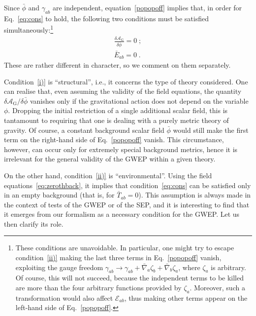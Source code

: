 \documentclass[a4paper,showkeys,aps,prd,reprint,nofootinbib,showpacs,twocolumn]{revtex4-1}
\newcommand{\subeq}[1]{\begin{subequations} #1 \end{subequations}}
\newcommand{\eq}[1]{\( #1 \)}
\newcommand{\gat}[1]{\begin{gather} #1 \end{gather}}
\newcommand{\Cal}[1]{\mathcal{#1}}
\theoremstyle{plain}
\begin{document}
Since \eq{\bar{\phi}} and \eq{\gamma_{ab}} are independent, equation~\eqref{popopoff} implies that, in order for Eq.~\eqref{eq:cons} to hold, the following two conditions must be satisfied simultaneously:\footnote{These conditions are unavoidable.  In particular, one might try to escape condition~\eqref{ii)} making the last three terms in Eq.~\eqref{popopoff} vanish, exploiting the gauge freedom \eq{\gamma_{ab} \to  \gamma_{ab} + \bar{\nabla}_{\! a} \zeta_{b}+ \bar{\nabla}_{\! b} \zeta_{a}}, where \eq{\zeta_a} is arbitrary.  Of course, this will not succeed, because the independent terms to be killed are  more than the four arbitrary functions provided by \eq{\zeta_a}.  Moreover, such a transformation would also affect \eq{\Cal{E}_{ab}}, thus making other terms appear on the left-hand side of Eq.~\eqref{popopoff}.}
%
\subeq{\gat{\frac{\delta \Cal{A}_{\text{G}}}{ \delta \bar{\phi}} = 0\;; \label{i)} \\
\bar{E}_{ab} = 0 \;. \label{ii)}}}
%
These are rather different in character, so we comment on them separately.

Condition~\eqref{i)} is ``structural'', i.e., it concerns the type of theory considered.  One can realise that, even assuming the validity of the field equations, the quantity \eq{{\delta\Cal{A}_{\text{G}}}/{\delta\bar{\phi}}} vanishes only if the gravitational action does not depend on the variable \eq{\phi}. Dropping the initial restriction of a single additional scalar field, this is tantamount to requiring that one is dealing with a purely metric theory of gravity.  Of course, a constant background scalar field \eq{\bar{\phi}} would still make the first term on the right-hand side of Eq.~\eqref{popopoff} vanish.  This circumstance, however, can occur only for extremely special background metrics, hence it is irrelevant for the general validity of the GWEP within a given theory.

On the other hand, condition~\eqref{ii)} is ``environmental''.  Using the field equations~\eqref{eq:zerothback}, it implies that condition~\eqref{eq:cons} can be satisfied only in an empty background (that is, for \eq{\bar{T}_{ab} = 0}).  This assumption is always made in the context of tests of the GWEP or of the SEP, and it is interesting to find that it emerges from our formalism as a necessary condition for the GWEP.  Let us then clarify its role.
\end{document}
